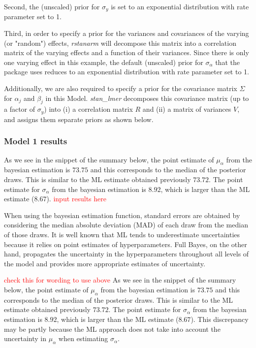 Second, the (unscaled) prior for $\sigma_{y}$ is set to an exponential distribution with rate parameter set to 1.

Third, in order to specify a prior for the variances and covariances of the varying (or "random") effects, \textit{rstanarm} will decompose this matrix into a correlation matrix of the varying effects and a function of their variances.  Since there is only one varying effect in this example, the default (unscaled) prior for $\sigma_{\alpha}$ that the package uses reduces to an exponential distribution with rate parameter set to 1.

Additionally, we are also required to specify a prior for the covariance matrix $\Sigma$ for $\alpha_j$ and $\beta_j$ in this Model.  \textit{stan\_lmer} decomposes this covariance matrix (up to a factor of $\sigma_y$) into (i) a correlation matrix $R$ and (ii) a matrix of variances $V$, and assigns them separate priors as shown below. 

\subsubsection*{Model 1 results}  
As we see in the snippet of the summary below, the point estimate of $\mu_{\alpha}$ from the bayesian estimation is $73.75$ and this corresponds to the median of the posterior draws.  This is similar to the ML estimate obtained previously $73.72$.  The point estimate for $\sigma_{\alpha}$ from the bayesian estimation is $8.92$, which is larger than the ML estimate ($8.67$). 
\textcolor{red}{input results here}

When using the bayesian estimation function, standard errors are obtained by considering the median absolute deviation (MAD) of each draw from the median of those draws.  It is well known that ML tends to underestimate uncertainties because it relies on point estimates of hyperparameters. Full Bayes, on the other hand, propagates the uncertainty in the hyperparameters throughout all levels of the model and provides more appropriate estimates of uncertainty.

\textcolor{red}{check this for wording to use above}
As we see in the snippet of the summary below, the point estimate of $\mu_{\alpha}$ from the bayesian estimation is $73.75$ and this corresponds to the median of the posterior draws.  This is similar to the ML estimate obtained previously $73.72$.  The point estimate for $\sigma_{\alpha}$ from the bayesian estimation is $8.92$, which is larger than the ML estimate ($8.67$). This discrepancy may be partly because the ML approach does not take into account the uncertainty in $\mu_{\alpha}$ when estimating $\sigma_{\alpha}$.

